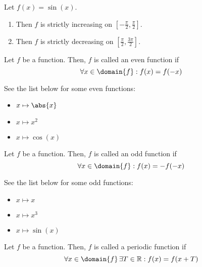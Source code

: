 \begin{exm}
	Let $f(x)=\sin(x)$.
	\begin{enumerate}
		\item Then $f$ is strictly increasing on $[-\tfrac{\pi}{2},\tfrac{\pi}{2}]$.
		\item Then $f$ is strictly decreasing on $[\tfrac{\pi}{2},\tfrac{3\pi}{2}]$.
	\end{enumerate}
\end{exm}

\begin{definition}\label{def-even-function}
	Let $f$ be a function. Then, $f$ is called an even function if
	\begin{equation}
		\forall x\in\domain{f}:f(x)=f(-x)
	\end{equation}
\end{definition}

\begin{exm}
	See the list below for some even functions:
	\begin{itemize}
		\item $x\mapsto\abs{x}$
		\item $x\mapsto x^2$
		\item $x\mapsto\cos(x)$
	\end{itemize}
\end{exm}

\begin{definition}\label{def-odd-function}
	Let $f$ be a function. Then, $f$ is called an odd function if
	\begin{equation}
		\forall x\in\domain{f}:f(x)=-f(-x)
	\end{equation}
\end{definition}

\begin{exm}
	See the list below for some odd functions:
	\begin{itemize}
		\item $x\mapsto x$
		\item $x\mapsto x^3$
		\item $x\mapsto\sin(x)$
	\end{itemize}
\end{exm}

\begin{definition}
	Let $f$ be a function. Then, $f$ is called a periodic function if
	\begin{equation}
		\forall x\in\domain{f}\,\exists T\in\mathbb{R}: f(x)=f(x+T)
	\end{equation}
\end{definition}

